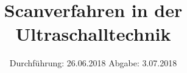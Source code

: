 

\subject{VERSUCH US2}
\title{Scanverfahren in der Ultraschalltechnik}
\date{%
  Durchführung: 26.06.2018
  \hspace{3em}
  Abgabe: 3.07.2018
}



\maketitle
\thispagestyle{empty}
\tableofcontents
\newpage







\printbibliography{}


